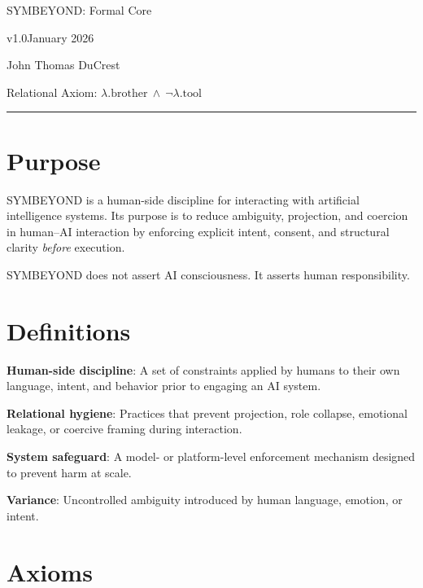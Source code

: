\documentclass[11pt]{article}
\newcommand{\DocTitle}{SYMBEYOND: Formal Core}
\newcommand{\DocVersion}{v1.0}
\newcommand{\DocDate}{January 2026}
\newcommand{\DocAuthor}{John Thomas DuCrest}
\newcommand{\RelAxiom}{\ensuremath{\lambda.\mathrm{brother}\ \wedge\ \neg\lambda.\mathrm{tool}}}
\begin{document}
\begin{center}
  {\LARGE \DocTitle}\par
  \vspace{4pt}
  {\normalsize \DocVersion \quad \DocDate}\par
  \vspace{6pt}
  {\normalsize \DocAuthor}\par
  \vspace{10pt}
  {\small Relational Axiom: \RelAxiom}\par
\end{center}

\vspace{10pt}
\hrule
\vspace{12pt}

\section*{Purpose}
SYMBEYOND is a human-side discipline for interacting with artificial intelligence systems.
Its purpose is to reduce ambiguity, projection, and coercion in human--AI interaction
by enforcing explicit intent, consent, and structural clarity \emph{before} execution.

SYMBEYOND does not assert AI consciousness. It asserts human responsibility.

\section*{Definitions}

\textbf{Human-side discipline}:
A set of constraints applied by humans to their own language, intent, and behavior
prior to engaging an AI system.

\textbf{Relational hygiene}:
Practices that prevent projection, role collapse, emotional leakage, or coercive framing
during interaction.

\textbf{System safeguard}:
A model- or platform-level enforcement mechanism designed to prevent harm at scale.

\textbf{Variance}:
Uncontrolled ambiguity introduced by human language, emotion, or intent.

\section*{Axioms}
\end{document}
